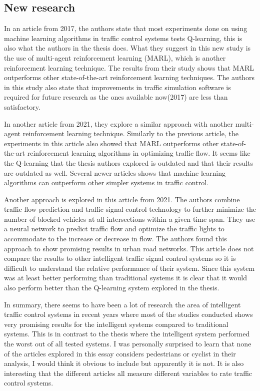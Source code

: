 \documentclass[10pt, a4paper]{article}
\begin{document}
\subsection{New research}
In an article from 2017\cite{marl}, the authors state that most experiments done on using machine learning algorithms in traffic control systems tests Q-learning,
this is also what the authors in the thesis does. What they suggest in this new study is the use of multi-agent reinforcement learning (MARL), which is another reinforcement
learning technique. The results from their study shows that MARL outperforms other state-of-the-art reinforcement learning techniques.
The authors in this study also state that improvements in traffic simulation software is required for future research as the ones available now(2017) are
less than satisfactory.

In another article from 2021\cite{marl2}, they explore a similar approach with another multi-agent reinforcement learning technique. Similarly to the previous article,
the experiments in this article also showed that MARL outperforms other state-of-the-art reinforcement learning algorithms in optimizing traffic flow.
It seems like the Q-learning that the thesis authors explored is outdated and that their results are outdated as well. Several newer articles shows that
machine learning algorithms can outperform other simpler systems in traffic control.

Another approach is explored in this article from 2021\cite{urban}. The authors combine traffic flow prediction and traffic signal control technology to
further minimize the number of blocked vehicles at all intersections within a given time span. They use a neural network to predict traffic flow and optimize
the traffic lights to accommodate to the increase or decrease in flow. The authors found this approach to show promising results in urban road networks.
This article does not compare the results to other intelligent traffic signal control systems so it is difficult to understand the relative performance
of their system. Since this system was at least better performing than traditional systems it is clear that it would also perform better than the Q-learning
system explored in the thesis.

In summary, there seems to have been a lot of research the area of intelligent traffic control systems in recent years where most of the studies conducted shows
very promising results for the intelligent systems compared to traditional systems. This is in contrast to the thesis where the intelligent system performed the worst
out of all tested systems. I was personally surprised to learn that none of the articles explored in this essay considers pedestrians or cyclist in their analysis,
I would think it obvious to include but apparently it is not. It is also interesting that the different articles all measure different variables to rate traffic
control systems. 




\end{document}

